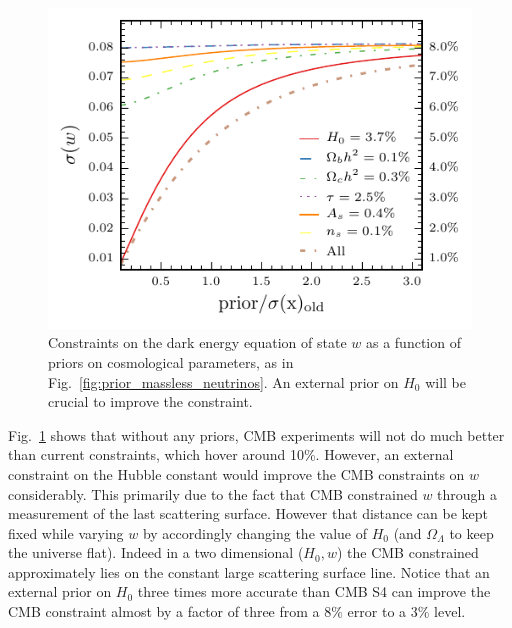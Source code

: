\documentclass[aps,prd,reprint,superscriptaddress]{revtex4-1}
\newcommand{\reffig}[1]{Fig.~\ref{fig:#1}}
\begin{document}
\begin{figure}[htbp]
\begin{center}
\includegraphics{prior_w_snow_mass_lmin=4_lmax=4499.pdf}
\caption{Constraints on the dark energy equation of state $w$ as a function of priors on cosmological parameters, as in \reffig{prior_massless_neutrinos}. An external prior on $H_{0}$ will be crucial to improve the constraint.} 
\label{fig:prior_w}
\end{center}
\end{figure}

\reffig{prior_w} shows that without any priors, CMB experiments will not do much better than current constraints, which hover around 10\%. However, an external constraint on the Hubble constant would improve the CMB constraints on $w$ considerably. 
This primarily due to the fact that CMB constrained $w$ through a measurement of the last scattering surface. However that distance can be kept fixed while varying $w$ by accordingly changing the value of $H_{0}$ (and $\Omega_{\Lambda}$ to keep the universe flat). Indeed in a two dimensional ($H_{0},w$) the CMB constrained approximately lies on the constant large scattering surface line.
Notice that an external prior on $H_{0}$ three times more accurate than CMB S4 can improve the CMB constraint almost by a factor of three from a $8\%$ error to a $3\%$ level.
\end{document}
